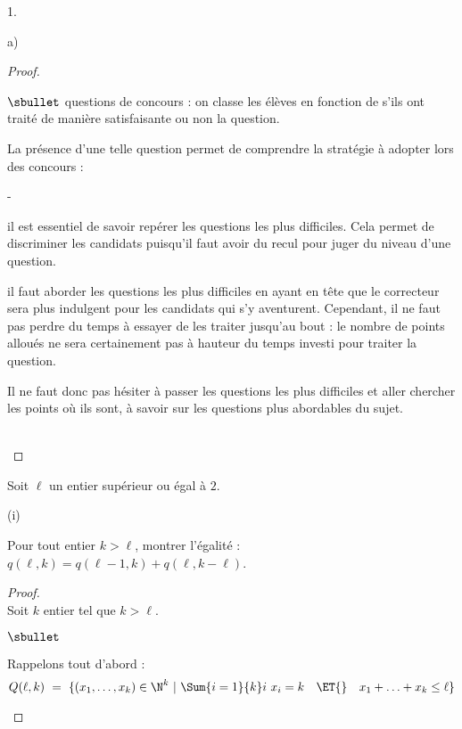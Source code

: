 \documentclass[11pt]{article}%
\begin{document}
\begin{noliste}{1.}
\begin{noliste}{a)}
\begin{proof}
\begin{remarkL}{.98}
\begin{noliste}{$\sbullet$}
          questions de concours : on classe les élèves en fonction de
          s'ils ont traité de manière satisfaisante ou non la question.
        \end{noliste}
        La présence d'une telle question permet de comprendre la
        stratégie à adopter lors des concours :
        \begin{noliste}{-}
        \item il est essentiel de savoir repérer les questions les
          plus difficiles. Cela permet de discriminer les candidats
          puisqu'il faut avoir du recul pour juger du niveau d'une
          question.
        \item il faut aborder les questions les plus difficiles en
          ayant en tête que le correcteur sera plus indulgent pour les
          candidats qui s'y aventurent. Cependant, il ne faut pas
          perdre du temps à essayer de les traiter jusqu'au bout : le
          nombre de points alloués ne sera certainement pas à hauteur
          du temps investi pour traiter la question. 
        \end{noliste}
        Il ne faut donc pas hésiter à passer les questions les plus
        difficiles et aller chercher les points où ils sont, à savoir
        sur les questions plus abordables du sujet.
      \end{remarkL}~\\[-1.4cm]
    \end{proof}


    \newpage
    
    
  \item Soit $\ell$ un entier supérieur ou égal à $2$.
    \begin{nonoliste}{(i)}
    \item Pour tout entier $k > \ell$, montrer l'égalité : \
      $q(\ell,k) = q(\ell-1,k) + q(\ell, k-\ell)$.
      
      \begin{proof}~\\%
        Soit $k$ entier tel que $k > \ell$.
        \begin{noliste}{$\sbullet$}
        \item Rappelons tout d'abord :
          \[
          Q(\ell, k) \ = \ \{ (x_1, \ldots, x_{k}) \in \N^{k} \ | \
          \Sum{i=1}{k} i \ x_i = k \quad \ET{} \quad x_1 + \ldots + x_{k} \leq
          \ell \}
          \]


\end{noliste}
\end{proof}
\end{nonoliste}
\end{noliste}
\end{noliste}
\end{document}
